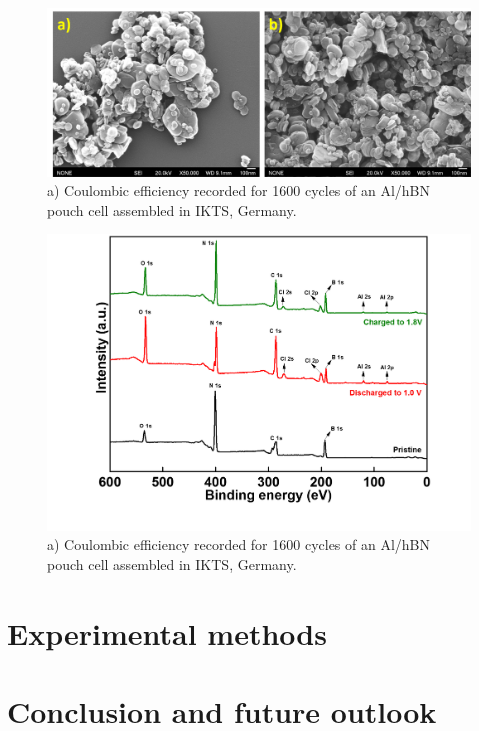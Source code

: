 \begin{figure}[tbh!]
\centering
\includegraphics[width=\textwidth]{Figures/BOhBN/BNNSSEM}
\caption{a) Coulombic efficiency recorded for 1600 cycles of an Al/hBN pouch cell assembled in IKTS, Germany.}
\label{Figures/BOhBN:BNNSSEM}
\end{figure}
\begin{figure}[tbh!]
\centering
\includegraphics[width=\textwidth]{Figures/BOhBN/hBNXPS}
\caption{a) Coulombic efficiency recorded for 1600 cycles of an Al/hBN pouch cell assembled in IKTS, Germany.}
\label{Figures/BOhBN:hBNXPS}
\end{figure}
\section{Experimental methods}
\section{Conclusion and future outlook}
